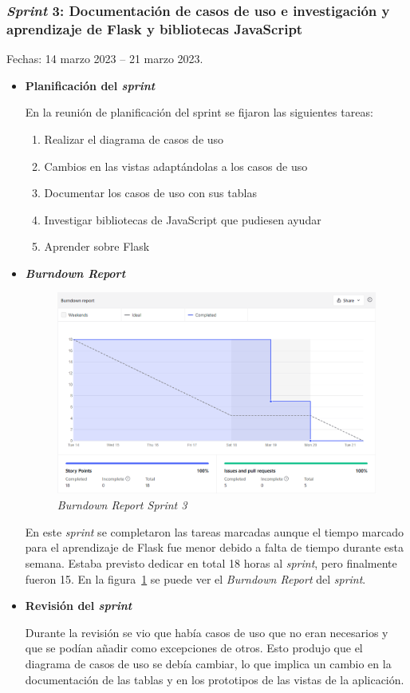 \subsubsection{\textit{Sprint} 3: Documentación de casos de uso e investigación y aprendizaje de Flask y bibliotecas JavaScript}
Fechas: 14 marzo 2023 -- 21 marzo 2023.
\begin{itemize}
\item\textbf{Planificación del \textit{sprint}}

En la reunión de planificación del sprint se fijaron las siguientes tareas:
\begin{enumerate}
		\item Realizar el diagrama de casos de uso
		\item Cambios en las vistas adaptándolas a los casos de uso
		\item Documentar los casos de uso con sus tablas
		\item Investigar bibliotecas de JavaScript que pudiesen ayudar
		\item Aprender sobre Flask
\end{enumerate}

\item\textbf{\textit{Burndown Report}}

\begin{figure}
	\centering
	\includegraphics[width=\textwidth]{../img/Anexos/Sprints/Sprint3.png}
	\caption{\textit{Burndown Report Sprint 3}}\label{ReportSprint3}
\end{figure}

En este \textit{sprint} se completaron las tareas marcadas aunque el tiempo marcado para el aprendizaje de Flask fue menor debido a falta de tiempo durante esta semana. Estaba previsto dedicar en total 18 horas al \textit{sprint}, pero finalmente fueron 15. En la figura~\ref{ReportSprint3} se puede ver el \textit{Burndown Report} del \textit{sprint}.

\item\textbf{Revisión del \textit{sprint}}

Durante la revisión se vio que había casos de uso que no eran necesarios y que se podían añadir como excepciones de otros. Esto produjo que el diagrama de casos de uso se debía cambiar, lo que implica un cambio en la documentación de las tablas y en los prototipos de las vistas de la aplicación.
\end{itemize}

